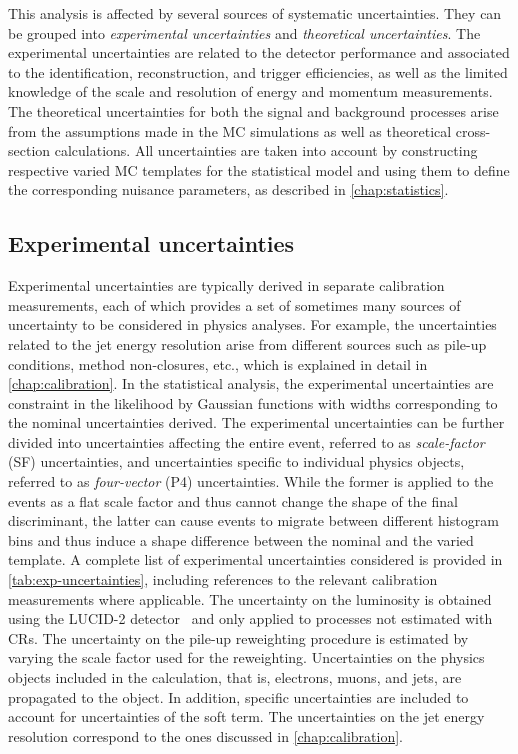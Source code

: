 This analysis is affected by several sources of systematic uncertainties.
They can be grouped into \emph{experimental uncertainties} and \emph{theoretical uncertainties}.
The experimental uncertainties are related to the detector performance and associated to the identification, reconstruction, and trigger efficiencies, as well as the limited knowledge of the scale and resolution of energy and momentum measurements.
The theoretical uncertainties for both the signal and background processes arise from the assumptions made in the MC simulations as well as theoretical cross-section calculations. 
All uncertainties are taken into account by constructing respective varied MC templates for the statistical model and using them to define the corresponding nuisance parameters, as described in \cref{chap:statistics}.

\subsection{Experimental uncertainties}
Experimental uncertainties are typically derived in separate calibration measurements, each of which provides a set of sometimes many sources of uncertainty to be considered in physics analyses.
For example, the uncertainties related to the jet energy resolution arise from different sources such as pile-up conditions, method non-closures, etc., which is explained in detail in \cref{chap:calibration}.
In the statistical analysis, the experimental uncertainties are constraint in the likelihood by Gaussian functions with widths corresponding to the nominal uncertainties derived.
The experimental uncertainties can be further divided into uncertainties affecting the entire event, referred to as \emph{scale-factor} (SF) uncertainties, and uncertainties specific to individual physics objects, referred to as \emph{four-vector} (P4) uncertainties.
While the former is applied to the events as a flat scale factor and thus cannot change the shape of the final discriminant, the latter can cause events to migrate between different histogram bins and thus induce a shape difference between the nominal and the varied template.
A complete list of experimental uncertainties considered is provided in \cref{tab:exp-uncertainties}, including references to the relevant calibration measurements where applicable.
The uncertainty on the luminosity is obtained using the LUCID-2 detector~\cite{ATLAS-CONF-2019-021} and only applied to processes not estimated with CRs. 
The uncertainty on the pile-up reweighting procedure is estimated by varying the scale factor used for the reweighting. 
Uncertainties on the physics objects included in the \MET calculation, that is, electrons, muons, and jets, are propagated to the \MET object. In addition, specific \MET uncertainties are included to account for uncertainties of the \MET soft term.
The uncertainties on the jet energy resolution correspond to the ones discussed in \cref{chap:calibration}. 

